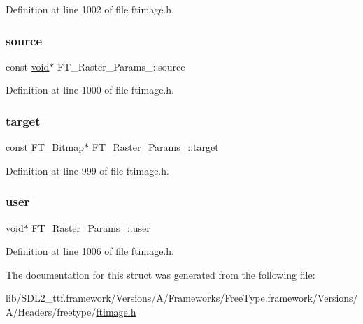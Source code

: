 Definition at line 1002 of file ftimage.\+h.

\mbox{\label{struct_f_t___raster___params___a9be95865384791b018f7a9665a062ee5}} 
\subsubsection{\texorpdfstring{source}{source}}
{\footnotesize\ttfamily const \mbox{\hyperlink{_s_d_l__opengles2__gl2ext_8h_ae5d8fa23ad07c48bb609509eae494c95}{void}}$\ast$ F\+T\+\_\+\+Raster\+\_\+\+Params\+\_\+\+::source}



Definition at line 1000 of file ftimage.\+h.

\mbox{\label{struct_f_t___raster___params___a2ba8941740db23ec91302aa9bd154da3}} 
\subsubsection{\texorpdfstring{target}{target}}
{\footnotesize\ttfamily const \mbox{\hyperlink{ftimage_8h_ae28691030f2d16376937cf5e3485f921}{F\+T\+\_\+\+Bitmap}}$\ast$ F\+T\+\_\+\+Raster\+\_\+\+Params\+\_\+\+::target}



Definition at line 999 of file ftimage.\+h.

\mbox{\label{struct_f_t___raster___params___af78bac59f93c989840bbcbcbefd77c55}} 
\subsubsection{\texorpdfstring{user}{user}}
{\footnotesize\ttfamily \mbox{\hyperlink{_s_d_l__opengles2__gl2ext_8h_ae5d8fa23ad07c48bb609509eae494c95}{void}}$\ast$ F\+T\+\_\+\+Raster\+\_\+\+Params\+\_\+\+::user}



Definition at line 1006 of file ftimage.\+h.



The documentation for this struct was generated from the following file\+:\begin{DoxyCompactItemize}
\item 
lib/\+S\+D\+L2\+\_\+ttf.\+framework/\+Versions/\+A/\+Frameworks/\+Free\+Type.\+framework/\+Versions/\+A/\+Headers/freetype/\mbox{\hyperlink{ftimage_8h}{ftimage.\+h}}\end{DoxyCompactItemize}
